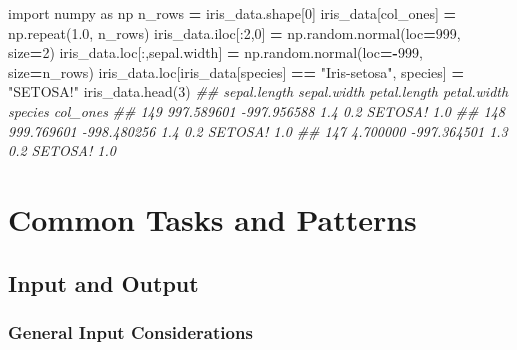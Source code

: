 \documentclass[
  12pt,
]{krantz}
\makeatletter
\newenvironment{Shaded}{\begin{snugshade}}{\end{snugshade}}
\newcommand{\CommentTok}[1]{\textcolor[rgb]{0.37,0.37,0.37}{\textit{#1}}}
\newcommand{\DecValTok}[1]{\textcolor[rgb]{0.06,0.06,0.06}{#1}}
\newcommand{\FloatTok}[1]{\textcolor[rgb]{0.06,0.06,0.06}{#1}}
\newcommand{\ImportTok}[1]{#1}
\newcommand{\NormalTok}[1]{#1}
\newcommand{\OperatorTok}[1]{\textcolor[rgb]{0.43,0.43,0.43}{\textbf{#1}}}
\newcommand{\StringTok}[1]{\textcolor[rgb]{0.5,0.5,0.5}{#1}}
\newenvironment{kframe}{%
\medskip{}
\setlength{\fboxsep}{.8em}
 \def\at@end@of@kframe{}%
 \ifinner\ifhmode%
  \def\at@end@of@kframe{\end{minipage}}%
  \begin{minipage}{\columnwidth}%
 \fi\fi%
 \def\FrameCommand##1{\hskip\@totalleftmargin \hskip-\fboxsep
 \colorbox{shadecolor}{##1}\hskip-\fboxsep
     \hskip-\linewidth \hskip-\@totalleftmargin \hskip\columnwidth}%
 \MakeFramed {\advance\hsize-\width
   \@totalleftmargin\z@ \linewidth\hsize
   \@setminipage}}%
 {\par\unskip\endMakeFramed%
 \at@end@of@kframe}
\renewenvironment{Shaded}{\begin{kframe}}{\end{kframe}}
\makeatother
\begin{document}
\begin{Shaded}
\begin{Highlighting}[]
\ImportTok{import}\NormalTok{ numpy }\ImportTok{as}\NormalTok{ np}
\NormalTok{n\_rows }\OperatorTok{=}\NormalTok{ iris\_data.shape[}\DecValTok{0}\NormalTok{]}
\NormalTok{iris\_data[}\StringTok{\textquotesingle{}col\_ones\textquotesingle{}}\NormalTok{] }\OperatorTok{=}\NormalTok{ np.repeat(}\FloatTok{1.0}\NormalTok{, n\_rows)}
\NormalTok{iris\_data.iloc[:}\DecValTok{2}\NormalTok{,}\DecValTok{0}\NormalTok{] }\OperatorTok{=}\NormalTok{  np.random.normal(loc}\OperatorTok{=}\DecValTok{999}\NormalTok{, size}\OperatorTok{=}\DecValTok{2}\NormalTok{)}
\NormalTok{iris\_data.loc[:,}\StringTok{\textquotesingle{}sepal.width\textquotesingle{}}\NormalTok{] }\OperatorTok{=}\NormalTok{ np.random.normal(loc}\OperatorTok{={-}}\DecValTok{999}\NormalTok{, size}\OperatorTok{=}\NormalTok{n\_rows)}
\NormalTok{iris\_data.loc[iris\_data[}\StringTok{\textquotesingle{}species\textquotesingle{}}\NormalTok{] }\OperatorTok{==} \StringTok{"Iris{-}setosa"}\NormalTok{, }\StringTok{\textquotesingle{}species\textquotesingle{}}\NormalTok{] }\OperatorTok{=} \StringTok{"SETOSA!"}
\NormalTok{iris\_data.head(}\DecValTok{3}\NormalTok{)}
\CommentTok{\#\#      sepal.length  sepal.width  petal.length  petal.width  species  col\_ones}
\CommentTok{\#\# 149    997.589601  {-}997.956588           1.4          0.2  SETOSA!       1.0}
\CommentTok{\#\# 148    999.769601  {-}998.480256           1.4          0.2  SETOSA!       1.0}
\CommentTok{\#\# 147      4.700000  {-}997.364501           1.3          0.2  SETOSA!       1.0}
\end{Highlighting}
\end{Shaded}

\hypertarget{part-common-tasks-and-patterns}{%
\part{Common Tasks and Patterns}\label{part-common-tasks-and-patterns}}

\hypertarget{input-and-output}{%
\chapter{Input and Output}\label{input-and-output}}

\hypertarget{general-input-considerations}{%
\section{General Input Considerations}\label{general-input-considerations}}
\end{document}
